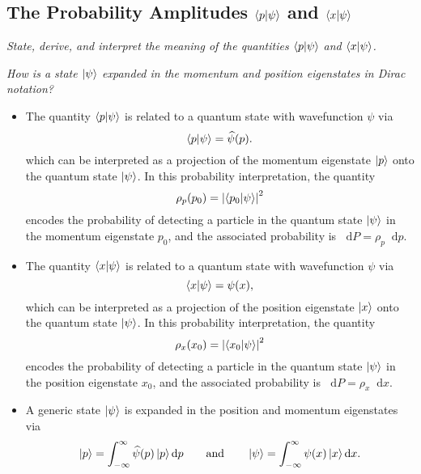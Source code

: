 \documentclass[11pt, a4paper]{article}
\newcommand{\diff}{\mathop{}\!\mathrm{d}} %
\newcommand{\F}[1]{\widehat{#1}} %
\begin{document}
\subsection{The Probability Amplitudes $ \braket{p}{\psi} $ and $ \braket{x}{\psi} $}

\textit{State, derive, and interpret the meaning of the quantities $ \braket{p}{\psi} $ and $ \braket{x}{\psi} $.}

\vspace{2mm}
\textit{How is a state $ \ket{\psi} $ expanded in the momentum and position eigenstates in Dirac notation?}

\begin{itemize}
    \item The quantity $ \braket{p}{\psi} $ is related to a quantum state with wavefunction $ \psi $ via
    \begin{equation*}
        \braket{p}{\psi} = \F{\psi}(p).
    \end{equation*}
    which can be interpreted as a projection of the momentum eigenstate $ \ket{p} $ onto the quantum state $ \ket{\psi} $. In this probability interpretation, the quantity
    \begin{equation*}
        \rho_{p}(p_{0}) = \abs{\braket{p_{0}}{\psi}}^{2}
    \end{equation*}
    encodes the probability of detecting a particle in the quantum state $ \ket{\psi} $ in the momentum eigenstate $ p_{0} $, and the associated probability is $ \diff P = \rho_{p} \diff p $.

    
    \item The quantity $ \braket{x}{\psi} $ is related to a quantum state with wavefunction $ \psi $ via
    \begin{equation*}
        \braket{x}{\psi} = \psi(x),
    \end{equation*}
    which can be interpreted as a projection of the position eigenstate $ \ket{x} $ onto the quantum state $ \ket{\psi} $. In this probability interpretation, the quantity
    \begin{equation*}
        \rho_{x}(x_{0}) = \abs{\braket{x_{0}}{\psi}}^{2}
    \end{equation*}
    encodes the probability of detecting a particle in the quantum state $ \ket{\psi} $ in the position eigenstate $ x_{0} $, and the associated probability is $ \diff P = \rho_{x} \diff x $.
    
    \item A generic state $ \ket{\psi} $ is expanded in the position and momentum eigenstates via
    \begin{equation*}
        \ket{p} = \int_{-\infty}^{\infty}\F{\psi}(p) \ket{p} \diff p \qquad \text{and} \qquad \ket{\psi} = \int_{-\infty}^{\infty}\psi(x) \ket{x}\diff x.
    \end{equation*}
    
\end{itemize}
\end{document}
